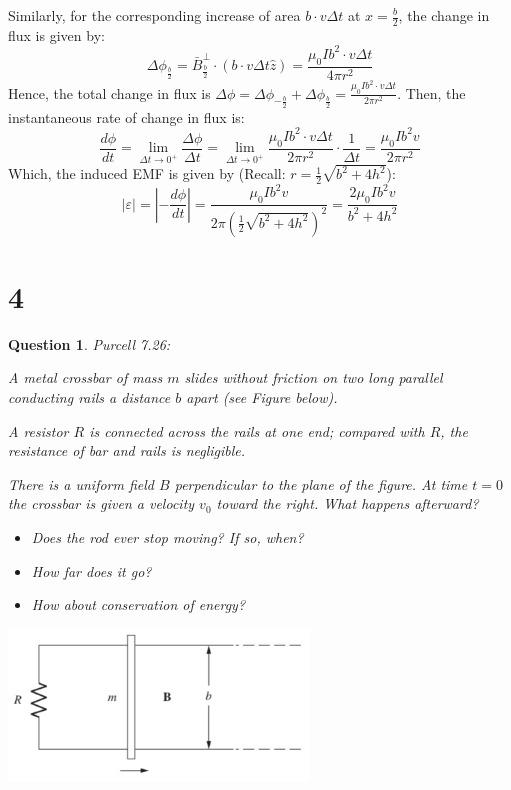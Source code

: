 \documentclass{article}
\newtheorem{question}{Question}
\begin{document}
Similarly, for the corresponding increase of area $b\cdot v\Delta t$ at $x=\frac{b}{2}$, the change in flux is given by:
$$\Delta\phi_{\frac{b}{2}}=\bar{B}^\perp_{\frac{b}{2}}\cdot\left(b\cdot v\Delta t\hat{z}\right)=\frac{\mu_0Ib^2\cdot v\Delta t}{4\pi r^2}$$
Hence, the total change in flux is $\Delta \phi = \Delta\phi_{-\frac{b}{2}}+\Delta\phi_{\frac{b}{2}}=\frac{\mu_0Ib^2\cdot v\Delta t}{2\pi r^2}$. Then, the instantaneous rate of change in flux is:
$$\frac{d\phi}{dt} = \lim_{\Delta t\rightarrow 0^+}\frac{\Delta \phi}{\Delta t}=\lim_{\Delta t\rightarrow 0^+}\frac{\mu_0Ib^2\cdot v\Delta t}{2\pi r^2}\cdot \frac{1}{\Delta t}=\frac{\mu_0Ib^2v}{2\pi r^2}$$
Which, the induced EMF is given by (Recall: $r=\frac{1}{2}\sqrt{b^2+4h^2}$):
$$|\varepsilon|=\left|-\frac{d\phi}{dt}\right|=\frac{\mu_0Ib^2v}{2\pi (\frac{1}{2}\sqrt{b^2+4h^2})^2} = \frac{2\mu_0Ib^2v}{b^2+4h^2}$$


\break

\section*{4}
\begin{myBox}[]{}
    \begin{question}
        Purcell 7.26:

        A metal crossbar of mass $m$ slides without friction on two long
        parallel conducting rails a distance $b$ apart (see Figure below). 
        
        A resistor $R$ is connected across the rails at one end; compared with $R$, 
        the resistance of bar and rails is negligible. 
        
        There is a uniform field $B$ perpendicular to the plane of the figure. 
        At time $t = 0$ the crossbar is given a velocity $v_0$ toward the right. 
        What happens afterward?

        \begin{itemize}
            \item[(a)]Does the rod ever stop moving? If so, when?
            \item[(b)]How far does it go?
            \item[(c)] How about conservation of energy?
        \end{itemize}
    \end{question}

    \begin{center}
        \includegraphics*[width=80mm]{7.25.png}
    \end{center}
\end{myBox}
\end{document}
